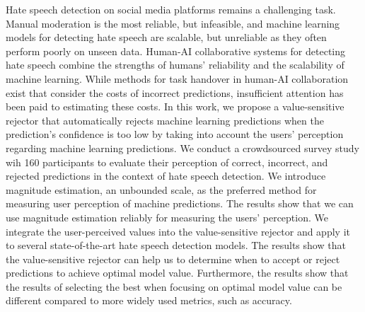 Hate speech detection on social media platforms remains a challenging task.
%
Manual moderation is the most reliable, but infeasible, and machine learning models for detecting hate speech are scalable, but unreliable as they often perform poorly on unseen data.
%
Human-AI collaborative systems for detecting hate speech combine the strengths of humans' reliability and the scalability of machine learning.
%
While methods for task handover in human-AI collaboration exist that consider the costs of incorrect predictions, insufficient attention has been paid to estimating these costs.
%
In this work, we propose a value-sensitive rejector that automatically rejects machine learning predictions when the prediction's confidence is too low by taking into account the users' perception regarding machine learning predictions.
%
We conduct a crowdsourced survey study wih 160 participants to evaluate their perception of correct, incorrect, and rejected predictions in the context of hate speech detection.
%
We introduce magnitude estimation, an unbounded scale, as the preferred method for measuring user perception of machine predictions.
%
The results show that we can use magnitude estimation reliably for measuring the users' perception.
%
We integrate the user-perceived values into the value-sensitive rejector and apply it to several state-of-the-art hate speech detection models.
%
The results show that the value-sensitive rejector can help us to determine when to accept or reject predictions to achieve optimal model value.
%
Furthermore, the results show that the results of selecting the best when focusing on optimal model value can be different compared to more widely used metrics, such as accuracy.